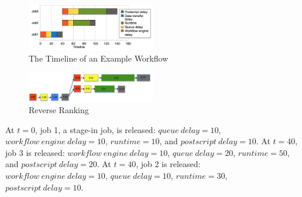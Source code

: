 \begin{figure}[h!]
	\centering
    \includegraphics[width=0.5\textwidth]{figures/model/overhead_timeline.pdf}
    \caption{The Timeline of an Example Workflow}
    \label{fig:model_overhead_timeline}
\end{figure}


\begin{figure}[h!]
	\centering
    \includegraphics[width=0.5\textwidth]{figures/model/rr.pdf}
    \caption{Reverse Ranking}
    \label{fig:model_rr}
\end{figure}

At $t=0$, job 1, a stage-in job, is released: $queue~delay = 10$, $workflow~engine~delay = 10$, $runtime = 10$, and $postscript~delay = 10$.
At $t=40$, job 3 is released: $workflow~engine~delay = 10$, $queue~delay = 20$, $runtime = 50$, and $postscript~delay = 20$.
At $t=40$, job 2 is released: $workflow~engine~delay = 10$, $queue~delay = 10$, $runtime = 30$, $postscript~delay = 10$. 

 



